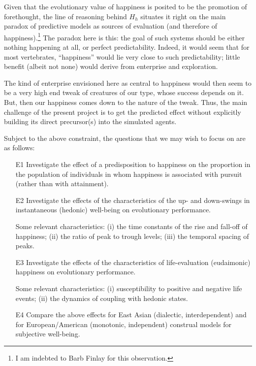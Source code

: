 \documentclass[11pt]{article}
\begin{document}
\noindent
Given that the evolutionary value of happiness is posited to be the
promotion of forethought, the line of reasoning behind $H_h$ situates
it right on the main paradox of predictive models \citep{Clark13} as
sources of evaluation (and therefore of happiness).\footnote{I am
  indebted to Barb Finlay for this observation.} The paradox here is
this: the goal of such systems should be either nothing happening at
all, or perfect predictability. Indeed, it would seem that for most
vertebrates, ``happiness'' would lie very close to such
predictability; little benefit (albeit not none) would derive from
enterprise and exploration.

The kind of enterprise envisioned here as central to happiness would
then seem to be a very high end tweak of creatures of our type, whose
success depends on it.  But, then our happiness comes down to the
nature of the tweak. Thus, the main challenge of the present project
is to get the predicted effect without explicitly building its direct
precursor(s) into the simulated agents.

Subject to the above constraint, the questions that we may wish to
focus on are as follows: 

\begin{itemize}

\item[E1] Investigate the effect of a predisposition to happiness on
  the proportion in the population of individuals in whom happiness is
  associated with pursuit (rather than with attainment).

\item[E2] Investigate the effects of the characteristics of the up-
  and down-swings in instantaneous (hedonic) well-being on
  evolutionary performance. 

  Some relevant characteristics: (i) the time constants of the rise
  and fall-off of happiness; (ii) the ratio of peak to trough levels;
  (iii) the temporal spacing of peaks.

\item[E3] Investigate the effects of the characteristics of
  life-evaluation (eudaimonic) happiness on evolutionary
  performance. 

  Some relevant characteristics: (i) susceptibility to positive and
  negative life events; (ii) the dynamics of coupling with hedonic
  states.

\item[E4] Compare the above effects for East Asian (dialectic,
  interdependent) and for European/American (monotonic, independent)
  construal models for subjective well-being.

\end{itemize}
\end{document}

